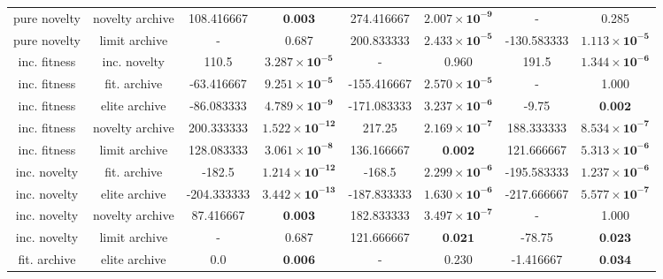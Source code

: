 \begin{tabular}{cccccccc}
   pure novelty & novelty archive &     108.416667 &                 $\textbf{0.003}$ &  274.416667 & $\mathbf{2.007 \times 10^{-9}}$ &           - &                           0.285 \\
   pure novelty &   limit archive &              - &                            0.687 &  200.833333 & $\mathbf{2.433 \times 10^{-5}}$ & -130.583333 & $\mathbf{1.113 \times 10^{-5}}$ \\
   inc. fitness &    inc. novelty &          110.5 &  $\mathbf{3.287 \times 10^{-5}}$ &           - &                           0.960 &       191.5 & $\mathbf{1.344 \times 10^{-6}}$ \\
   inc. fitness &    fit. archive &     -63.416667 &  $\mathbf{9.251 \times 10^{-5}}$ & -155.416667 & $\mathbf{2.570 \times 10^{-5}}$ &           - &                           1.000 \\
   inc. fitness &   elite archive &     -86.083333 &  $\mathbf{4.789 \times 10^{-9}}$ & -171.083333 & $\mathbf{3.237 \times 10^{-6}}$ &       -9.75 &                $\textbf{0.002}$ \\
   inc. fitness & novelty archive &     200.333333 & $\mathbf{1.522 \times 10^{-12}}$ &      217.25 & $\mathbf{2.169 \times 10^{-7}}$ &  188.333333 & $\mathbf{8.534 \times 10^{-7}}$ \\
   inc. fitness &   limit archive &     128.083333 &  $\mathbf{3.061 \times 10^{-8}}$ &  136.166667 &                $\textbf{0.002}$ &  121.666667 & $\mathbf{5.313 \times 10^{-6}}$ \\
   inc. novelty &    fit. archive &         -182.5 & $\mathbf{1.214 \times 10^{-12}}$ &      -168.5 & $\mathbf{2.299 \times 10^{-6}}$ & -195.583333 & $\mathbf{1.237 \times 10^{-6}}$ \\
   inc. novelty &   elite archive &    -204.333333 & $\mathbf{3.442 \times 10^{-13}}$ & -187.833333 & $\mathbf{1.630 \times 10^{-6}}$ & -217.666667 & $\mathbf{5.577 \times 10^{-7}}$ \\
   inc. novelty & novelty archive &      87.416667 &                 $\textbf{0.003}$ &  182.833333 & $\mathbf{3.497 \times 10^{-7}}$ &           - &                           1.000 \\
   inc. novelty &   limit archive &              - &                            0.687 &  121.666667 &                $\textbf{0.021}$ &      -78.75 &                $\textbf{0.023}$ \\
   fit. archive &   elite archive &            0.0 &                 $\textbf{0.006}$ &           - &                           0.230 &   -1.416667 &                $\textbf{0.034}$ \\

\end{tabular}
